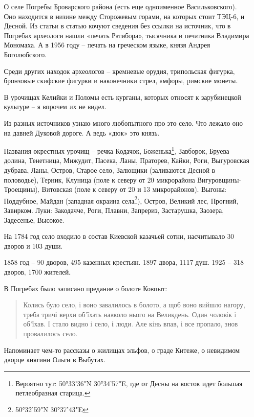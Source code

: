 О селе Погребы Броварского района (есть еще одноименное Васильковского). Оно находится в низине между Сторожевым горами, на которых стоит ТЭЦ-6, и Десной. Из статьи в статью кочуют сведения без ссылки на источник, что в Погребах археологи нашли «печать Ратибора», тысячника и печатника Владимира Мономаха. А в 1956 году – печать на греческом языке, князя Андрея Боголюбского.

Среди других находок археологов – кремневые орудия, трипольская фигурка, бронзовые скифские фигурки и наконечники стрел, амфоры, римские монеты.

В урочищах Келийки и Поломы есть курганы, которых относят к зарубинецкой культуре – я впрочем их не видел.

Из разных источников узнаю много любопытного про это село. Что лежало оно на давней Дуковой дороге. А ведь «дюк» это князь.

Названия окрестных урочищ – речка Кодачок, Боженька\footnote{Вероятно тут: 50°33'36"N  30°34'57"E, где от Десны на восток идет большая петлеобразная старица.}, Завборок, Бруева долина, Тенетница, Мижудит, Пасека, Ланы, Праторев, Кайки, Роги, Выгуровская дубрава, Ланы, Остров, Старое село, Залющики (заливаются Десной в половодье), Терник, Клуница (поле к северу от 20 микрорайона Вигуровщины-Троещины), Витовская (поле к северу от 20 и 13 микрорайонов). Выгоны: Поддубное, Майдан (западная окраина села\footnote{50°32'59"N 30°37'43"E}), Остров, Великий лес, Прогний, Завирком. Луки: Закодачче, Роги, Плавни, Запрериз, Застарушка, Заозера, Задесенье, Высокое.

На 1784 год село входило в состав Киевской казачьей сотни, насчитывало 30 дворов и 103 души.

1858 год – 90 дворов, 495 казенных крестьян. 1897 двора, 1117 душ. 1925 – 318 дворов, 1700 жителей.


В Погребах было записано предание о болоте Ковпыт:

\begin{quotation}
Колись було село, і воно завалилось в болото, а щоб воно вийшло нагору, треба тричі верхи об'їхать навколо нього на Великдень. Один чоловік і об'їхав. І стало видно і село, і люди. Але кінь впав, і все пропало, знов провалилось село.
\end{quotation}

Напоминает чем-то рассказы о жилищах эльфов, о граде Китеже, о невидимом дворце княгини Ольги в Выбутах.

